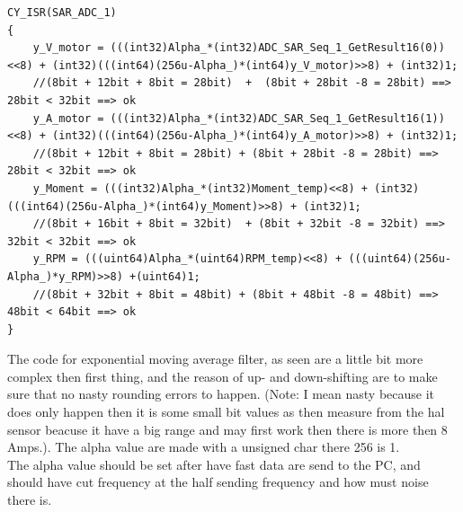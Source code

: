 \lstset{language=C}
\begin{lstlisting}
CY_ISR(SAR_ADC_1)
{
	y_V_motor = (((int32)Alpha_*(int32)ADC_SAR_Seq_1_GetResult16(0))<<8) + (int32)(((int64)(256u-Alpha_)*(int64)y_V_motor)>>8) + (int32)1;
	//(8bit + 12bit + 8bit = 28bit)  +  (8bit + 28bit -8 = 28bit) ==> 28bit < 32bit ==> ok
	y_A_motor = (((int32)Alpha_*(int32)ADC_SAR_Seq_1_GetResult16(1))<<8) + (int32)(((int64)(256u-Alpha_)*(int64)y_A_motor)>>8) + (int32)1;
	//(8bit + 12bit + 8bit = 28bit) + (8bit + 28bit -8 = 28bit) ==> 28bit < 32bit ==> ok
	y_Moment = (((int32)Alpha_*(int32)Moment_temp)<<8) + (int32)(((int64)(256u-Alpha_)*(int64)y_Moment)>>8) + (int32)1;
	//(8bit + 16bit + 8bit = 32bit)  + (8bit + 32bit -8 = 32bit) ==> 32bit < 32bit ==> ok
	y_RPM = (((uint64)Alpha_*(uint64)RPM_temp)<<8) + (((uint64)(256u-Alpha_)*y_RPM)>>8) +(uint64)1;
	//(8bit + 32bit + 8bit = 48bit) + (8bit + 48bit -8 = 48bit) ==> 48bit < 64bit ==> ok
}
\end{lstlisting}

The code for exponential moving average filter, as seen are a little bit more complex then first thing, and the reason of up- and down-shifting are to make sure that no nasty rounding errors to happen. (Note: I mean nasty because it does only happen then it is some small bit values as then measure from the hal sensor beacuse it have a big range and may first work then there is more then 8 Amps.). The alpha value are made with a unsigned char there 256 is 1.\\
The alpha value should be set after have fast data are send to the PC, and should have cut frequency at the half sending frequency and how must noise there is.



